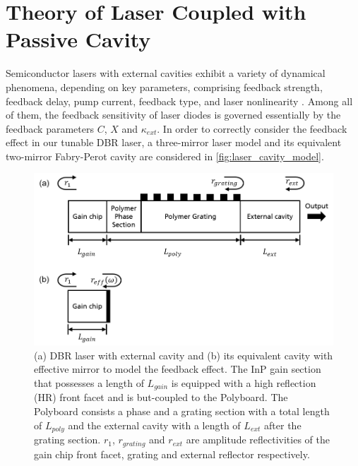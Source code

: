 \chapter{Theory of Laser Coupled with Passive Cavity}
\label{ch:Theory}
Semiconductor lasers with external cavities exhibit a variety of dynamical phenomena, depending on key parameters, comprising feedback strength, feedback delay, pump current, feedback type, and laser nonlinearity \cite{soriano2013complex}. Among all of them, the feedback sensitivity of laser diodes is governed essentially by the feedback parameters $C$, $X$ and $\kappa_{ext}$. In order to correctly consider the feedback effect in our tunable DBR laser, a three-mirror laser model and its equivalent two-mirror Fabry-Perot cavity are considered in \autoref{fig:laser_cavity_model}.

\begin{figure}[ht]
    \centering
    \includegraphics[width=.9\linewidth]{figures/laser_cavity_model.png}
    \caption{(a) DBR laser with external cavity and (b) its equivalent cavity with effective mirror to model the feedback effect. The InP gain section that possesses a length of $L_{gain}$ is equipped with a high reflection (HR) front facet and is but-coupled to the Polyboard. The Polyboard consists a phase and a grating section with a total length of $L_{poly}$ and the external cavity with a length of $L_{ext}$ after the grating section. $r_1$, $r_{grating}$ and $r_{ext}$ are amplitude reflectivities of the gain chip front facet, grating and external reflector respectively.}
    \label{fig:laser_cavity_model}
\end{figure}

